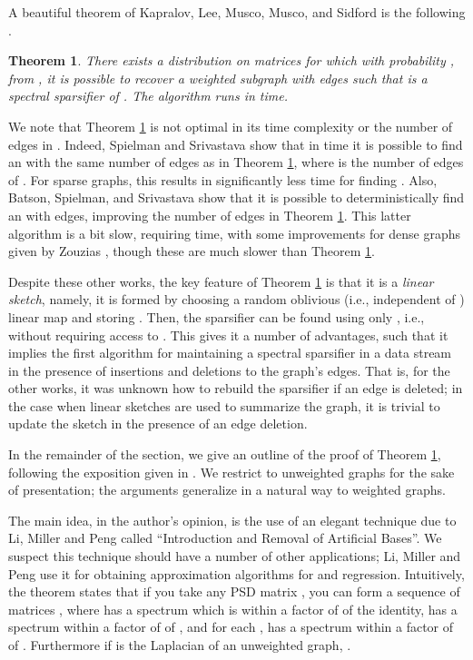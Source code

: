 \documentclass[11pt]{article}
\newtheorem{theorem}{Theorem}
\begin{document}
A beautiful theorem of Kapralov, Lee, Musco, Musco, and Sidford is the following \cite{KLMMS14}. 
\begin{theorem}\label{thm:linear}
There exists a distribution  on  matrices
 for which with probability , from , it is possible to recover a
weighted subgraph  with  edges such that  is a spectral sparsifier of . 
The algorithm runs in  time.  
\end{theorem}

We note that Theorem \ref{thm:linear} is not optimal in its time complexity or the number of edges
in . Indeed, Spielman and Srivastava \cite{SS08} show that in  time
it is possible to find an  with the same number  of edges as in Theorem \ref{thm:linear},
where  is the number of edges of . For sparse graphs, this results in significantly less time for finding
. Also, Batson, Spielman, and Srivastava \cite{BSS09} show that it is possible to deterministically find
an  with  edges, improving the  number of edges in Theorem \ref{thm:linear}. This
latter algorithm is a bit slow, requiring  time, with some improvements for dense graphs 
given by Zouzias \cite{z12}, though these are much slower than Theorem \ref{thm:linear}. 

Despite these other works, the key feature of Theorem \ref{thm:linear} is that it is a {\it linear sketch}, namely, it is formed by choosing a random oblivious (i.e., independent of ) linear map  and storing . Then, the sparsifier
 can be found using only , i.e., without requiring
access to . This gives
it a number of advantages, such that it implies the first algorithm for maintaining a spectral sparsifier in a
data stream in the presence of insertions and deletions to the graph's edges. That is, for the other works, it was
unknown how to rebuild the sparsifier if an edge is deleted; in the case when linear sketches are used to summarize
the graph, it is trivial to update the sketch in the presence of an edge deletion. 

In the remainder of the section, we give an outline of the proof of Theorem \ref{thm:linear}, following the exposition given
in \cite{KLMMS14}. We restrict to unweighted graphs for the sake of presentation; the arguments generalize in a natural
way to weighted graphs. 

The main idea, in the author's opinion, is the 
use of an elegant technique due to Li, Miller and Peng \cite{lmp13} called ``Introduction and Removal of Artificial Bases''. 
We suspect this technique should have a number of other applications; Li, Miller and Peng use it for
obtaining approximation algorithms for  and  regression. 
Intuitively, the theorem states that if you take any PSD matrix , you can form a sequence
of matrices , where  has a spectrum which is
within a factor of  of the identity,  has a spectrum within a factor of 
 of , and for
each ,  has a spectrum within a factor of  of . Furthermore
if  is the Laplacian of an unweighted graph, . 
\end{document}
